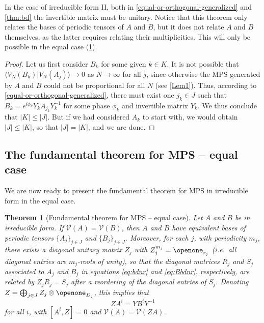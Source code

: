\documentclass[pra,a4paper,notitlepage,nofootinbib,superscriptaddress]{revtex4-1}
\theoremstyle{plain}
\newtheorem{theorem}[lemma]{Theorem}
\newcommand{\1}{{\openone}}
\newcommand{\mc}{\mathcal}
\begin{document}
In the case of irreducible form II, both in  \cref{equal-or-orthogonal-generalized} and \cref{thm:bd} the invertible matrix must be unitary.
Notice that this theorem only relates the bases of periodic tensors of $A$ and $B$, but it does not relate  $A$ and $B$ themselves, as the latter requires relating their multiplicities.
This will only be possible in the equal case (\cref{thm:bdequal}).


\begin{proof}
    Let us first consider $B_k$ for some given $k\in K$. It is not possible that $\langle V_N(B_k)|V_N(A_j)\rangle\to 0$ as $N\to\infty$ for all $j$, since otherwise the MPS generated by $A$ and $B$ could not be proportional for all $N$ (see \cref{Lem1}). Thus, according to  \cref{equal-or-orthogonal-generalized}, there must exist one $j_k\in J$ such that $B_k = e^{i\phi_k} Y_k A_{j_k} Y_k^{-1}$ for some phase $\phi_k$ and invertible matrix  $Y_k$. We thus conclude that $|K|\le |J|$.  But if we had considered $A_k$ to start with, we would obtain $|J|\le |K|$, so that $|J|=|K|$, and we are done.
\end{proof}


\subsection{The fundamental theorem for MPS -- equal case}
\label{ssec:thmequal}


We are now ready to present the fundamental theorem for MPS in irreducible form in the equal case.


\begin{theorem}[Fundamental theorem for MPS -- equal case]\label{thm:bdequal}
    Let $A$ and $B$ be in irreducible form.  If $\mc{V}(A) =  \mc{V}(B)$,
    then $A$ and $B$ have equivalent bases of periodic tensors $\{A_j\}_{j\in
                J}$ and $\{B_j\}_{j\in J}$. Moreover,  for each $j$, with periodicity
    $m_j$, there exists a diagonal unitary matrix $Z_j$ with
    $Z_j^{m_j}=\1_{r_j}$
    (i.e.\ all diagonal entries are $m_j$-roots of unity),
    so that the diagonal matrices $R_j$ and $S_j$ associated to $A_j$ and $B_j$ in equations \eqref{eq:bdnr} and \eqref{eq:Bbdnr}, respectively, are related by $Z_jR_j=S_j$ after a reordering of the diagonal entries of $S_j$.
    Denoting $Z=\bigoplus_{j\in J} Z_j\otimes \1_{D_j}$, this implies that
    $$
        Z A^i = YB^i Y^{-1}
    $$
    for all $i$, with $[A^i,Z]=0$ and $\mc{V}(A) = \mc{V}(ZA)$.
\end{theorem}
\end{document}

